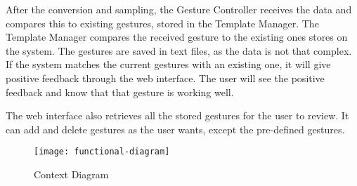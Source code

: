 \documentclass{standalone}
\begin{document}
  After the conversion and sampling, the Gesture Controller receives the data
  and compares this to existing gestures, stored in the Template Manager. The
  Template Manager compares the received gesture to the existing ones stores on
  the system. The gestures are saved in text files, as the data is not that
  complex. If the system matches the current gestures with an existing one, it
  will give positive feedback through the web interface. The user will see the
  positive feedback and know that that gesture is working well.

  The web interface also retrieves all the stored gestures for the user to
  review. It can add and delete gestures as the user wants, except the
  pre-defined gestures.

  \begin{figure}[h]
    \caption{Context Diagram}
    \centering
    \texttt{[image: functional-diagram]}
  \end{figure}
  \clearpage
\end{document}
